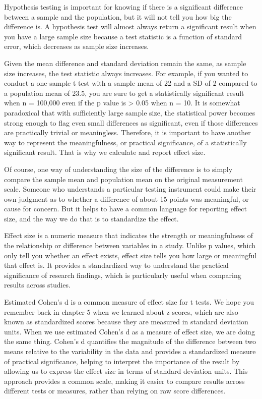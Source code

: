 \documentclass[
  letterpaper,
  DIV=11,
  numbers=noendperiod]{scrreprt}
\begin{document}
Hypothesis testing is important for knowing if there is a significant
difference between a sample and the population, but it will not tell you
how big the difference is. A hypothesis test will almost always return a
significant result when you have a large sample size because a test
statistic is a function of standard error, which decreases as sample
size increases.

Given the mean difference and standard deviation remain the same, as
sample size increases, the test statistic always increases. For example,
if you wanted to conduct a one-sample t test with a sample mean of 22
and a SD of 2 compared to a population mean of 23.5, you are sure to get
a statistically significant result when n = 100,000 even if the p value
is \textgreater{} 0.05 when n = 10. It is somewhat paradoxical that with
sufficiently large sample size, the statistical power becomes strong
enough to flag even small differences as significant, even if those
differences are practically trivial or meaningless. Therefore, it is
important to have another way to represent the meaningfulness, or
practical significance, of a statistically significant result. That is
why we calculate and report effect size.

Of course, one way of understanding the size of the difference is to
simply compare the sample mean and population mean on the original
measurement scale. Someone who understands a particular testing
instrument could make their own judgment as to whether a difference of
about 15 points was meaningful, or cause for concern. But it helps to
have a common language for reporting effect size, and the way we do that
is to standardize the effect.

Effect size is a numeric measure that indicates the strength or
meaningfulness of the relationship or difference between variables in a
study. Unlike p values, which only tell you whether an effect exists,
effect size tells you how large or meaningful that effect is. It
provides a standardized way to understand the practical significance of
research findings, which is particularly useful when comparing results
across studies.

Estimated Cohen's d is a common measure of effect size for t tests. We
hope you remember back in chapter 5 when we learned about z scores,
which are also known as standardized scores because they are measured in
standard deviation units. When we use estimated Cohen's d as a measure
of effect size, we are doing the same thing. Cohen's d quantifies the
magnitude of the difference between two means relative to the
variability in the data and provides a standardized measure of practical
significance, helping to interpret the importance of the result by
allowing us to express the effect size in terms of standard deviation
units. This approach provides a common scale, making it easier to
compare results across different tests or measures, rather than relying
on raw score differences.
\end{document}
